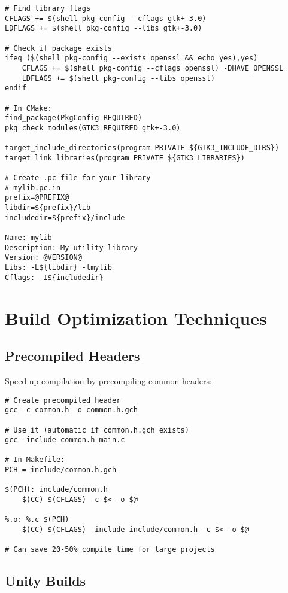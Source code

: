\begin{lstlisting}
# Find library flags
CFLAGS += $(shell pkg-config --cflags gtk+-3.0)
LDFLAGS += $(shell pkg-config --libs gtk+-3.0)

# Check if package exists
ifeq ($(shell pkg-config --exists openssl && echo yes),yes)
    CFLAGS += $(shell pkg-config --cflags openssl) -DHAVE_OPENSSL
    LDFLAGS += $(shell pkg-config --libs openssl)
endif

# In CMake:
find_package(PkgConfig REQUIRED)
pkg_check_modules(GTK3 REQUIRED gtk+-3.0)

target_include_directories(program PRIVATE ${GTK3_INCLUDE_DIRS})
target_link_libraries(program PRIVATE ${GTK3_LIBRARIES})

# Create .pc file for your library
# mylib.pc.in
prefix=@PREFIX@
libdir=${prefix}/lib
includedir=${prefix}/include

Name: mylib
Description: My utility library
Version: @VERSION@
Libs: -L${libdir} -lmylib
Cflags: -I${includedir}
\end{lstlisting}

\section{Build Optimization Techniques}

\subsection{Precompiled Headers}

Speed up compilation by precompiling common headers:

\begin{lstlisting}
# Create precompiled header
gcc -c common.h -o common.h.gch

# Use it (automatic if common.h.gch exists)
gcc -include common.h main.c

# In Makefile:
PCH = include/common.h.gch

$(PCH): include/common.h
	$(CC) $(CFLAGS) -c $< -o $@

%.o: %.c $(PCH)
	$(CC) $(CFLAGS) -include include/common.h -c $< -o $@

# Can save 20-50% compile time for large projects
\end{lstlisting}

\subsection{Unity Builds}

